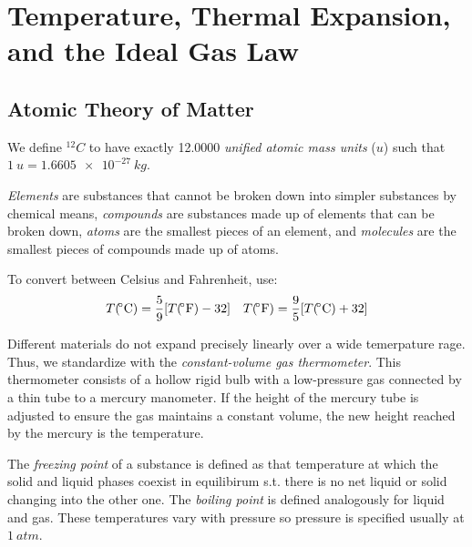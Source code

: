 \setcounter{chapter}{16}

\chapter{Temperature, Thermal Expansion, and the Ideal Gas Law}

\section{Atomic Theory of Matter}

\begin{definition}
    We define $^{12}C$ to have exactly 12.0000 \emph{unified atomic mass units} ($u$) such that $\qty{1}{u} = \qty{1.6605e-27}{kg}$.
\end{definition}
\begin{definition}
    \emph{Elements} are substances that cannot be broken down into simpler substances by chemical means, \emph{compounds} are substances made up of elements that can be broken down, \emph{atoms} are the smallest pieces of an element, and \emph{molecules} are the smallest pieces of compounds made up of atoms.
\end{definition}
\begin{proposition}
    To convert between Celsius and Fahrenheit, use:
    \[T(\degree \text{C}) = \frac{5}{9}[T(\degree \text{F}) - 32] \quad T(\degree \text{F}) = \frac{9}{5}[T(\degree \text{C}) +32]\]
\end{proposition}
\begin{remark}
    Different materials do not expand precisely linearly over a wide temerpature rage. Thus, we standardize with the \emph{constant-volume gas thermometer}. This thermometer consists of a hollow rigid bulb with a low-pressure gas connected by a thin tube to a mercury manometer. If the height of the mercury tube is adjusted to ensure the gas maintains a constant volume, the new height reached by the mercury is the temperature.
\end{remark}
\begin{definition}
    The \emph{freezing point} of a substance is defined as that temperature at which the solid and liquid phases coexist in equilibirum s.t. there is no net liquid or solid changing into the other one. The \emph{boiling point} is defined analogously for liquid and gas. These temperatures vary with pressure so pressure is specified usually at $\qty{1}{atm}$.
\end{definition}
